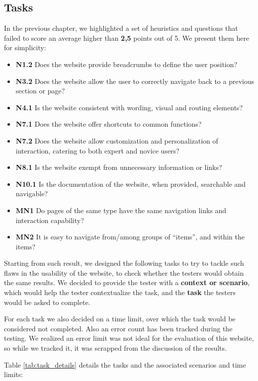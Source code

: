 \subsection{Tasks}
In the previous chapter, we highlighted a set of heuristics and questions that failed to score an average higher than \textbf{2,5} points out of 5. We present them here for simplicity:
\begin{itemize}
	\item \textbf{N1.2} Does the website provide breadcrumbs to define the user position?
	\item \textbf{N3.2} Does the website allow the user to correctly navigate back to a previous section or page?
	\item \textbf{N4.1} Is the website consistent with wording, visual and routing elements?
	\item \textbf{N7.1} Does the website offer shortcuts to common functions?
	\item \textbf{N7.2} Does the website allow customization and personalization of interaction, catering to both expert and novice users?
	\item \textbf{N8.1} Is the website exempt from unnecessary information or links?
	\item \textbf{N10.1} Is the documentation of the website, when provided, searchable and navigable?
	\item \textbf{MN1} Do pages of the same type have the same navigation links and interaction capability?
	\item \textbf{MN2} It is easy to navigate from/among groups of “items”, and within the items?
\end{itemize}

Starting from such result, we designed the following tasks to try to tackle such flaws in the usability of the website, to check whether the testers would obtain the same results. We decided to provide the tester with a \textbf{context or scenario}, which would help the tester contextualize the task, and the \textbf{task} the testers would be asked to complete.

For each task we also decided on a time limit, over which the task would be considered not completed. Also an error count has been tracked during the testing. We realized an error limit was not ideal for the evaluation of this website, so while we tracked it, it was scrapped from the discussion of the results.

Table \ref{tab:task_details} details the tasks and the associated scenarios and time limits:

